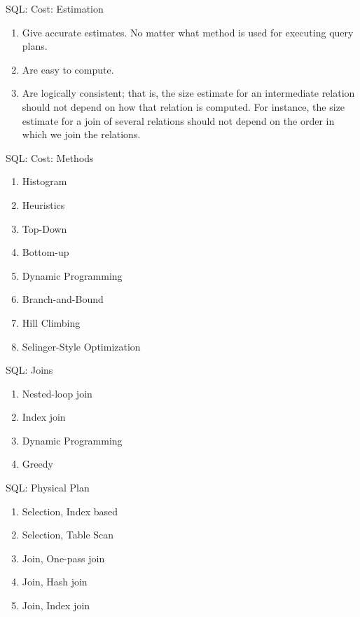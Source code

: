 \begin{frame}{SQL: Cost: Estimation}
    \begin{enumerate}[<+->]
        \item Give accurate estimates. No matter what method is used for executing query plans.
        \item Are easy to compute.
        \item Are logically consistent; that is, the size estimate for an intermediate re­lation should not depend on how that relation is computed. For instance, the size estimate for a join of several relations should not depend on the order in which we join the relations.
    \end{enumerate}
\end{frame}

\begin{frame}{SQL: Cost: Methods}
    \begin{enumerate}[<+->]
        \item Histogram
        \item Heuristics
        \item Top-Down
        \item Bottom-up
        \item Dynamic Programming
        \item Branch-and-Bound
        \item Hill Climbing
        \item Selinger-Style Optimization
    \end{enumerate}
\end{frame}

\begin{frame}{SQL: Joins}
    \begin{enumerate}[<+->]
        \item Nested-loop join
        \item Index join
        \item Dynamic Programming
        \item Greedy
    \end{enumerate}
\end{frame}

\begin{frame}{SQL: Physical Plan}
    \begin{enumerate}[<+->]
        \item Selection, Index based
        \item Selection, Table Scan
        \item Join, One-pass join
        \item Join, Hash join
        \item Join, Index join
    \end{enumerate}
\end{frame}

